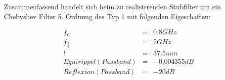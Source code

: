 Zusammenfassend handelt sich beim zu realisierenden Stubfilter um ein Chebyshev Filter 5. Ordnung des Typ 1 mit folgenden Eigeschaften: 
\begin{mdframed}
\begin{equation*} 
\begin{array}{cllll} 
f_C & = & 0.8 GHz \\ 
f_\frac{\lambda}{4} & = & 2 GHz \\ 
l & = & 37.5mm \\
Equirippel (Passband) & = & -0.004355 dB \\
Reflexion (Passband) & = & -20 dB \\
\end{array} 
\end{equation*} 
\end{mdframed}



